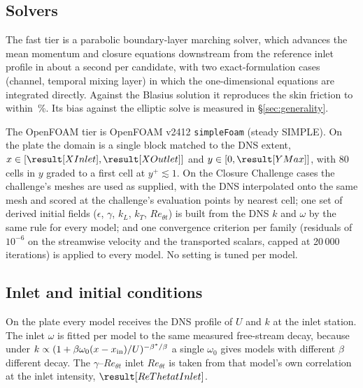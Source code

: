 \documentclass[lineno]{jfm}
\begin{document}
\begin{table}
  \begin{center}
  \footnotesize
  \closuresTable
  \caption{Every closure tested. Coefficients are those of the cited
    publication unless a calibration case is listed.}
  \label{tab:closures}
  \end{center}
\end{table}

\subsection{Solvers}

The fast tier is a parabolic boundary-layer marching solver, which advances
the mean momentum and closure equations downstream from the reference inlet
profile in about a second per candidate, with two exact-formulation cases
(channel, temporal mixing layer) in which the one-dimensional equations are
integrated directly. Against the Blasius solution it reproduces the skin
friction to within \,\%. Its bias
against the elliptic solve is measured in \S\ref{sec:generality}.

The OpenFOAM tier is OpenFOAM v2412 \texttt{simpleFoam} (steady SIMPLE). On
the plate the domain is a single block matched to the DNS extent,
$x \in [\result[XInlet], \result[XOutlet]]$ and $y \in [0, \result[YMax]]$,
with 80 cells in $y$ graded to a first cell at $y^+ \lesssim 1$. On the
Closure Challenge cases the challenge's meshes are used as supplied, with
the DNS interpolated onto the same mesh and scored at the challenge's
evaluation points by nearest cell; one set of derived initial fields
($\epsilon$, $\gamma$, $k_L$, $k_T$, $Re_{\theta t}$) is built from the DNS
$k$ and $\omega$ by the same rule for every model; and one convergence
criterion per family (residuals of $10^{-6}$ on the streamwise velocity and
the transported scalars, capped at 20\,000 iterations) is applied to every
model. No setting is tuned per model.

\subsection{Inlet and initial conditions}

On the plate every model receives the DNS profile of $U$ and $k$ at the
inlet station. The inlet $\omega$ is fitted per model to the same measured
free-stream decay, because under
$k \propto (1 + \beta \omega_0 (x-x_{\rm in})/U)^{-\beta^*/\beta}$ a
single $\omega_0$ gives models with different $\beta$ different decay. The
$\gamma$--$Re_{\theta t}$ inlet $Re_{\theta t}$ is taken from that model's
own correlation at the inlet intensity, $\result[ReThetatInlet]$.
\end{document}
